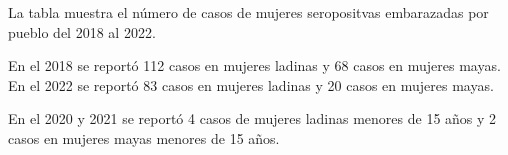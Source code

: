 La tabla muestra el número de casos de mujeres seropositvas embarazadas por pueblo del 2018 al 2022.  

En el 2018 se reportó 112 casos en mujeres ladinas y 68 casos en mujeres mayas. En el 2022 se reportó 83 casos en mujeres ladinas y 20 casos en mujeres mayas. 

En el 2020 y 2021 se reportó 4 casos de mujeres ladinas menores de 15 años y 2 casos en mujeres mayas menores de 15 años. 